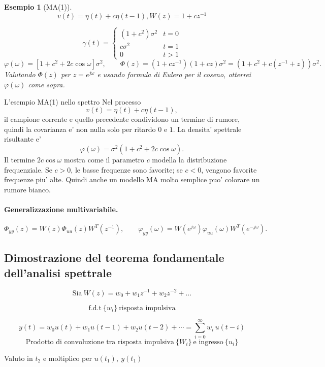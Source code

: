 \documentclass[11pt,a4paper]{article}
\newtheorem{example}{Esempio}
\begin{document}
\begin{example}[MA(1)]
\[
v(t)=\eta(t)+c\eta(t-1), W(z)=1+cz^{-1}
\]

\[
\gamma(t)=\begin{cases}(1+c^2)\sigma^2 & t=0\\ c\sigma^2 & t= 1\\ 0 & t>1\end{cases}
\]
\[
\varphi(\omega)=[1+c^2+2c\cos\omega]\sigma^2,\qquad \Phi(z)=(1+cz^{-1})(1+cz)\sigma^2= (1+c^2+c(z^{-1} + z))\sigma^2.
\]
Valutando $\varPhi(z)$ per $z=e^{j\omega}$ e usando formula di Eulero per il coseno, otterrei $\varphi(\omega)$ come sopra.
\end{example}

\begin{spiegazione}{L'esempio MA(1) nello spettro}
Nel processo
\[
v(t)=\eta(t)+c\eta(t-1),
\]
il campione corrente e quello precedente condividono un termine di rumore, quindi la covarianza e' non nulla solo per ritardo $0$ e $1$. La densita' spettrale risultante e'
\[
\varphi(\omega)=\sigma^2(1+c^2+2c\cos\omega).
\]
Il termine $2c\cos\omega$ mostra come il parametro $c$ modella la distribuzione frequenziale. Se $c>0$, le basse frequenze sono favorite; se $c<0$, vengono favorite frequenze piu' alte. Quindi anche un modello MA molto semplice puo' colorare un rumore bianco.
\end{spiegazione}

\paragraph{Generalizzazione multivariabile.}
\[
\Phi_{yy}(z)=W(z)\Phi_{uu}(z)W^{T}(z^{-1}),\qquad \varphi_{yy}(\omega)=W(e^{j\omega})\varphi_{uu}(\omega)W^{T}(e^{-j\omega}).
\]

\subsection{Dimostrazione del teorema fondamentale dell'analisi spettrale}
\[
\text{Sia} \  W(z)=w_0+w_1 z^{-1}+w_2 z^{-2}+\dots
\]

\[
\text{f.d.t} \ \{w_i\} \ \text{risposta impulsiva}
\]

\[
y(t)=w_0u(t)+w_1u(t-1)+w_2u(t-2)+\cdots =\sum_{i=0}^{\infty}w_i\,u(t-i)
\]
\[
\text{Prodotto di convoluzione tra risposta impulsiva}\  \{W_i\} \ \text{e ingresso} \ \{u_i\} 
\]

Valuto in $t_2$ e moltiplico per  $u(t_1), \ y(t_1)$
\end{document}
